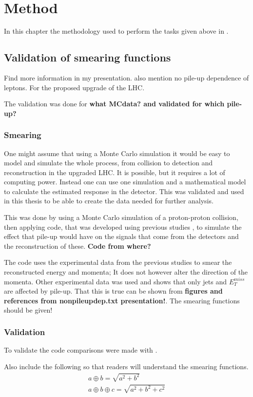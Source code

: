 \chapter{Method}\label{cha:meth}
In this chapter the methodology used to perform the tasks given above in .
\newpage
\section{Validation of smearing functions}
Find more information in my presentation. also mention no pile-up dependence of leptons.
For the proposed upgrade of the LHC.

The validation was done for \textbf{what MCdata? and validated for which pile-up?}

\subsection{Smearing}
One might assume that using a Monte Carlo simulation it would be easy to model and simulate the whole process, from collision to detection and reconstruction in the upgraded LHC. It is possible, but it requires a lot of computing power. Instead one can use one simulation and a mathematical model to calculate the estimated response in the detector. This was validated and used in this thesis to be able to create the data needed for further analysis. 

This was done by using a Monte Carlo simulation of a proton-proton collision, then applying code, that was developed using previous studies \citep{ATL-PHYS-PUB-2013-004} , to simulate the effect that pile-up would have on the signals that come from the detectors and the reconstruction of these. \textbf{Code from where?}

The code uses the experimental data from the previous studies to smear the reconstructed energy and momenta; It does not however alter the direction of the momenta. Other experimental data was used and shows that only jets and $E^{miss}_T$ are affected by pile-up. That this is true can be shown from \textbf{figures and references from nonpileupdep.txt presentation!}. The smearing functions should be given!

\subsection{Validation}
To validate the code comparisons were made with \citep{ATL-PHYS-PUB-2013-004}. 

Also include the following so that readers will understand the smearing functions.
\begin{eqnarray}
a\oplus b = \sqrt{a^2 + b^2} \\
a\oplus b\oplus c = \sqrt{a^2+b^2+c^2} 
\end{eqnarray}

